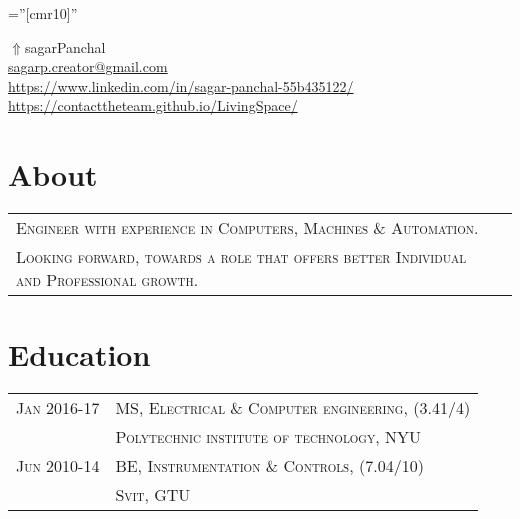 \documentclass[a4paper]{article}
\begin{document}
\pagestyle{empty} 						%
\font\fb=''[cmr10]'' 						%

\par	{\centering
	\href{https://contacttheteam.github.io/LivingSpace/}{$ \Uparrow$}{sagarPanchal}																																\\
	\small \href{mailto:sagarp.creator@gmail.com}{sagarp.creator@gmail.com}																						\\
	\small \href{https://www.linkedin.com/in/sagar-panchal-55b435122/}{https://www.linkedin.com/in/sagar-panchal-55b435122/}		\textbullet \href{https://contacttheteam.github.io/LivingSpace/}{https://contacttheteam.github.io/LivingSpace/}		\par}
	
\section	{	About		}
	\begin{tabular}{ll}
		\textsc{	Engineer with experience in Computers,  Machines \& Automation.					}\\
		\textsc{	Looking forward,  towards a role that offers better Individual and Professional growth.	}
	\\\end{tabular}

\section	{	Education		}
	\begin{tabular}{rl}
		\small{}\textsc{		Jan 2016-17	} 		& 		\textsc{	MS, Electrical \& Computer engineering, 		\small {(3.41/4)}			}	\\
 											& 		\textsc{	Polytechnic institute of technology, NYU							}	\\
 		\small{}\textsc{		Jun 2010-14	} 		& 		\textsc{	BE, Instrumentation \small{\&} Controls,		\small {(7.04/10)}		}	\\
 											& 		\textsc{	Svit, GTU													}	\\
	\end{tabular}

\end{document}
